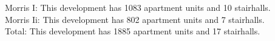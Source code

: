 {Morris I}: This development has 1083 apartment units and 10 stairhalls.\\{Morris Ii}: This development has 802 apartment units and 7 stairhalls.\\{Total}: This development has 1885 apartment units and 17 stairhalls.\\